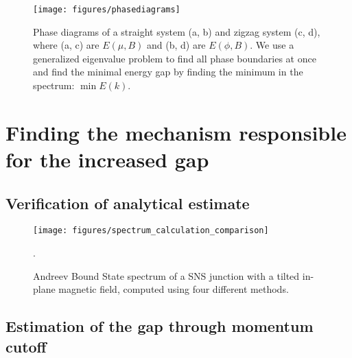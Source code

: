 			\begin{figure}[!htb]
			\centering
			\texttt{[image: figures/phasediagrams]}
			\caption{Phase diagrams of a straight system (a, b) and zigzag system (c, d), where (a, c) are $E(\mu, B)$ and (b, d) are $E(\phi, B)$.
			We use a generalized eigenvalue problem to find all phase boundaries at once and find the minimal energy gap by finding the minimum in the spectrum: $\min{E(k)}$.
			\label{fig:phasediagrams}}
			\end{figure}

	\section{Finding the mechanism responsible for the increased gap}
		\subsection{Verification of analytical estimate}
			\begin{figure}[!htb]
			\centering
			\texttt{[image: figures/spectrum\_calculation\_comparison]}
			\caption{Andreev Bound State spectrum of a SNS junction with a tilted in-plane magnetic field, computed using four different methods.}.
			\label{fig:spectrum_calculation_comparison}
			\end{figure}
			
		\subsection{Estimation of the gap through momentum cutoff}

		